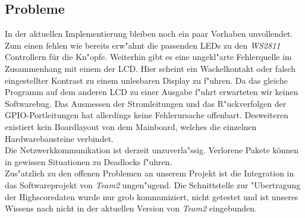 \documentclass[a4paper]{article}
\begin{document}
  \subsection{Probleme}
  In der aktuellen Implementierung bleiben noch ein paar Vorhaben unvollendet.
  Zum einen fehlen wie bereits erw"ahnt die passenden LEDs zu den
  \textit{WS2811} Controllern für die Kn"opfe. Weiterhin gibt es eine
  ungekl"arte Fehlerquelle im Zusammenhang mit einem der LCD. Hier scheint
  ein Wackelkontakt oder falsch eingestellter Kontrast zu einem unlesbaren
  Display zu f"uhren. Da das gleiche Programm auf dem anderen LCD zu einer
  Ausgabe f"uhrt erwarteten wir keinen Softwarebug. Das Ausmessen der
  Stromleitungen und das R"uckverfolgen der GPIO-Portleitungen hat allerdings
  keine Fehlerursache offenbart. Desweiteren existiert kein Boardlayout von dem
  Mainboard, welches die einzelnen Hardwarebausteine verbindet.\\ Die
  Netzwerkkommunikation ist derzeit unzuverla"ssig. Verlorene Pakete können in
  gewissen Situationen zu Deadlocks f"uhren.\\
  Zus"atzlich zu den offenen Problemen an unserem Projekt ist die Integration
  in das Softwareprojekt von \textit{Team2} ungen"ugend. Die Schnittstelle zur
  "Ubertragung der Highscoredaten wurde nur grob kommuniziert, nicht getestet
  und ist unseres Wissens nach nicht in der aktuellen Version von
  \textit{Team2} eingebunden.
\end{document}
